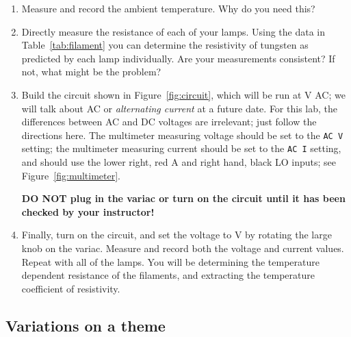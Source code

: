 \documentclass[12pt]{article}
\begin{document}
\begin{enumerate}
\item Measure and record the ambient temperature.  Why do you need
  this? 
\item Directly measure the resistance of each of your lamps.  Using
  the data in Table~\ref{tab:filament} you can determine the
  resistivity of tungsten as predicted by each lamp individually.  Are
  your measurements consistent?  If not, what might be the problem?
\item Build the circuit shown in Figure~\ref{fig:circuit}, which will
  be run at \unit[120]{V} AC; we will talk about AC or
  \textit{alternating current} at a future date.  For this lab, the
  differences between AC and DC voltages are irrelevant; just follow
  the directions here.  The multimeter measuring voltage should be set
  to the \texttt{AC V} setting; the multimeter measuring current
  should be set to the \texttt{AC I} setting, and should use the lower
  right, red \unit[10]{A} and right hand, black LO inputs; see
  Figure~\ref{fig:multimeter}.

  \begin{framed}
    \textbf{DO NOT plug in the variac or turn on the circuit until it
      has been checked by your instructor!}
  \end{framed}
  
\item Finally, turn on the circuit, and set the voltage to
  \unit[120]{V} by rotating the large knob on the variac.  Measure and
  record both the voltage and current values.  Repeat with all of the
  lamps.  You will be determining the temperature dependent resistance
  of the filaments, and extracting the temperature coefficient of
  resistivity.
\end{enumerate}

\subsection{Variations on a theme}
\label{sec:variations}
\end{document}
